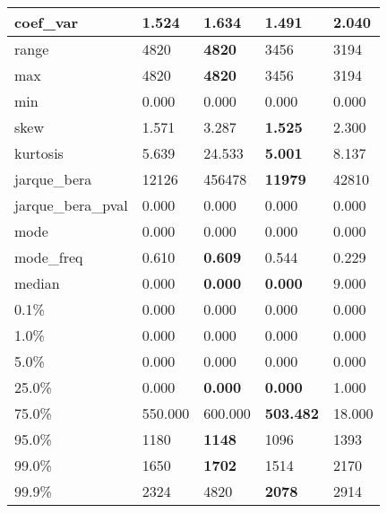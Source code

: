 \begin{table}[H]
\begin{tabular}{|l|m{10em}|m{10em}|m{10em}|m{10em}|}
\hline coef\_var & 1.524 & 1.634 & \bfseries 1.491 & \cellcolor[rgb]{0.9, 0.54, 0.52} 2.040 \\
\hline range & 4820 & \bfseries 4820 & 3456 & \cellcolor[rgb]{0.9, 0.54, 0.52} 3194 \\
\hline max & 4820 & \bfseries 4820 & 3456 & \cellcolor[rgb]{0.9, 0.54, 0.52} 3194 \\
\hline min & 0.000 & 0.000 & 0.000 & 0.000 \\
\hline skew & 1.571 & \cellcolor[rgb]{0.9, 0.54, 0.52} 3.287 & \bfseries 1.525 & 2.300 \\
\hline kurtosis & 5.639 & \cellcolor[rgb]{0.9, 0.54, 0.52} 24.533 & \bfseries 5.001 & 8.137 \\
\hline jarque\_bera & 12126 & \cellcolor[rgb]{0.9, 0.54, 0.52} 456478 & \bfseries 11979 & 42810 \\
\hline jarque\_bera\_pval & 0.000 & 0.000 & 0.000 & 0.000 \\
\hline mode & 0.000 & 0.000 & 0.000 & 0.000 \\
\hline mode\_freq & 0.610 & \bfseries 0.609 & 0.544 & \cellcolor[rgb]{0.9, 0.54, 0.52} 0.229 \\
\hline median & 0.000 & \bfseries 0.000 & \bfseries 0.000 & \cellcolor[rgb]{0.9, 0.54, 0.52} 9.000 \\
\hline 0.1\% & 0.000 & 0.000 & 0.000 & 0.000 \\
\hline 1.0\% & 0.000 & 0.000 & 0.000 & 0.000 \\
\hline 5.0\% & 0.000 & 0.000 & 0.000 & 0.000 \\
\hline 25.0\% & 0.000 & \bfseries 0.000 & \bfseries 0.000 & \cellcolor[rgb]{0.9, 0.54, 0.52} 1.000 \\
\hline 75.0\% & 550.000 & 600.000 & \bfseries 503.482 & \cellcolor[rgb]{0.9, 0.54, 0.52} 18.000 \\
\hline 95.0\% & 1180 & \bfseries 1148 & 1096 & \cellcolor[rgb]{0.9, 0.54, 0.52} 1393 \\
\hline 99.0\% & 1650 & \bfseries 1702 & 1514 & \cellcolor[rgb]{0.9, 0.54, 0.52} 2170 \\
\hline 99.9\% & 2324 & \cellcolor[rgb]{0.9, 0.54, 0.52} 4820 & \bfseries 2078 & 2914 \\
\hline
\end{tabular}
\end{table}
